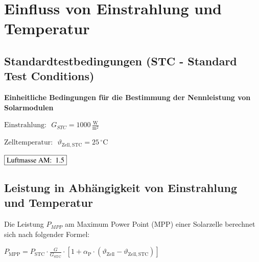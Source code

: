 \columnbreak
\section{Einfluss von Einstrahlung und Temperatur}



\subsection{Standardtestbedingungen (STC - Standard Test Conditions)}
\textbf{Einheitliche Bedingungen für die Bestimmung der Nennleistung von Solarmodulen}

\vspace{0.1cm}

$\boxed{\mathrm{Einstrahlung:\,\,\,} G_{STC} = 1000 \, \frac{\mathrm{W}}{\mathrm{m^2}}}$

$\boxed{\mathrm{Zelltemperatur:\,\,\,} \vartheta_{\mathrm{Zell},\mathrm{STC}} = 25 \, {^\circ \mathrm{C}}}$

$\boxed{\text{Luftmasse AM:\,\,\,} 1.5}$

\subsection{Leistung in Abhängigkeit von Einstrahlung und Temperatur}

Die Leistung $P_{MPP}$ am Maximum Power Point (MPP) einer Solarzelle berechnet sich nach folgender Formel:

$\boxed{
P_{\mathrm{MPP}} = P_{\mathrm{STC}} \cdot \frac{G}{G_{\mathrm{STC}}} \cdot \left[1 + \alpha_{\mathrm{P}} \cdot \left(\vartheta_{\mathrm{Zell}} - \vartheta_{\mathrm{Zell},\mathrm{STC}}\right) \right]
}$

\vspace{0.1cm}

